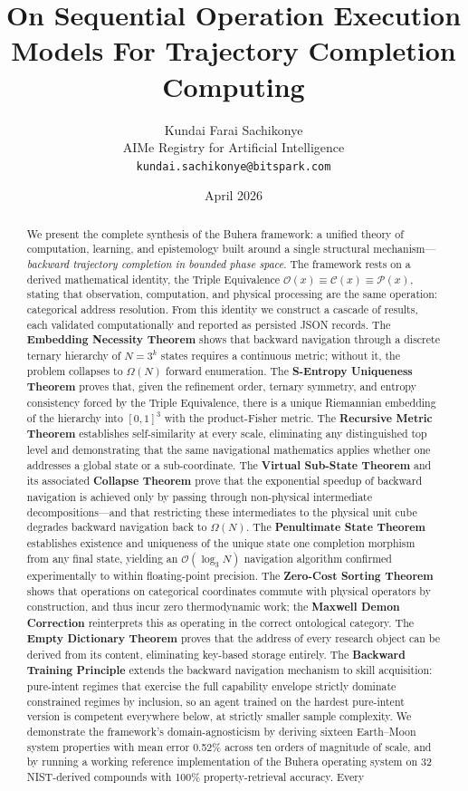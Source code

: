 \documentclass[twocolumn,11pt,a4paper]{article}
\title{\textbf{On Sequential Operation Execution Models For Trajectory Completion Computing}}
\author{
Kundai Farai Sachikonye\\
AIMe Registry for Artificial Intelligence\\
\texttt{kundai.sachikonye@bitspark.com}
}
\date{April 2026}
\begin{document}
\maketitle

\begin{abstract}
We present the complete synthesis of the Buhera framework: a unified theory of computation, learning, and epistemology built around a single structural mechanism---\emph{backward trajectory completion in bounded phase space}. The framework rests on a derived mathematical identity, the Triple Equivalence $\mathcal{O}(x) \equiv \mathcal{C}(x) \equiv \mathcal{P}(x)$, stating that observation, computation, and physical processing are the same operation: categorical address resolution. From this identity we construct a cascade of results, each validated computationally and reported as persisted JSON records. The \textbf{Embedding Necessity Theorem} shows that backward navigation through a discrete ternary hierarchy of $N = 3^k$ states requires a continuous metric; without it, the problem collapses to $\Omega(N)$ forward enumeration. The \textbf{S-Entropy Uniqueness Theorem} proves that, given the refinement order, ternary symmetry, and entropy consistency forced by the Triple Equivalence, there is a unique Riemannian embedding of the hierarchy into $[0,1]^3$ with the product-Fisher metric. The \textbf{Recursive Metric Theorem} establishes self-similarity at every scale, eliminating any distinguished top level and demonstrating that the same navigational mathematics applies whether one addresses a global state or a sub-coordinate. The \textbf{Virtual Sub-State Theorem} and its associated \textbf{Collapse Theorem} prove that the exponential speedup of backward navigation is achieved only by passing through non-physical intermediate decompositions---and that restricting these intermediates to the physical unit cube degrades backward navigation back to $\Omega(N)$. The \textbf{Penultimate State Theorem} establishes existence and uniqueness of the unique state one completion morphism from any final state, yielding an $\mathcal{O}(\log_3 N)$ navigation algorithm confirmed experimentally to within floating-point precision. The \textbf{Zero-Cost Sorting Theorem} shows that operations on categorical coordinates commute with physical operators by construction, and thus incur zero thermodynamic work; the \textbf{Maxwell Demon Correction} reinterprets this as operating in the correct ontological category. The \textbf{Empty Dictionary Theorem} proves that the address of every research object can be derived from its content, eliminating key-based storage entirely. The \textbf{Backward Training Principle} extends the backward navigation mechanism to skill acquisition: pure-intent regimes that exercise the full capability envelope strictly dominate constrained regimes by inclusion, so an agent trained on the hardest pure-intent version is competent everywhere below, at strictly smaller sample complexity. We demonstrate the framework's domain-agnosticism by deriving sixteen Earth--Moon system properties with mean error 0.52\% across ten orders of magnitude of scale, and by running a working reference implementation of the Buhera operating system on 32 NIST-derived compounds with 100\% property-retrieval accuracy. Every 
\end{abstract}
\end{document}
